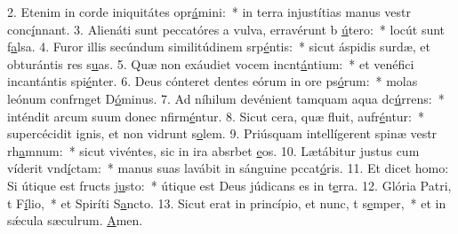 2. Etenim in corde iniquitátes opr\uline{á}mini:~* in terra injustítias manus vestr conc\uline{í}nnant.
3. Alienáti sunt peccatóres a vulva, erravérunt b \uline{ú}tero:~* locút sunt f\uline{a}lsa.
4. Furor illis secúndum similitúdinem srp\uline{é}ntis:~* sicut áspidis surdæ, et obturántis res s\uline{u}as.
5. Quæ non exáudiet vocem incnt\uline{á}ntium:~* et venéfici incantántis spi\uline{é}nter.
6. Deus cónteret dentes eórum in ore ps\uline{ó}rum:~* molas leónum confrnget D\uline{ó}minus.
7. Ad níhilum devénient tamquam aqua dc\uline{ú}rrens:~* inténdit arcum suum donec nfirm\uline{é}ntur.
8. Sicut cera, quæ fluit, aufr\uline{é}ntur:~* supercécidit ignis, et non vidrunt s\uline{o}lem.
9. Priúsquam intellígerent spinæ vestr rh\uline{a}mnum:~* sicut vivéntes, sic in ira absrbet \uline{e}os.
10. Lætábitur justus cum víderit vnd\uline{í}ctam:~* manus suas lavábit in sánguine pccat\uline{ó}ris.
11. Et dicet homo: Si útique est fructs j\uline{u}sto:~* útique est Deus júdicans es in t\uline{e}rra.
12. Glória Patri, t F\uline{í}lio,~* et Spiríti S\uline{a}ncto.
13. Sicut erat in princípio, et nunc, t s\uline{e}mper,~* et in sǽcula sæculrum. \uline{A}men.
